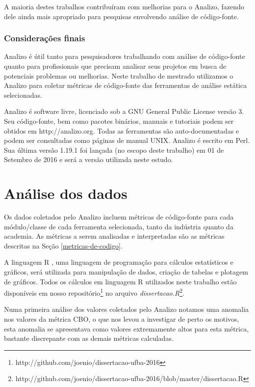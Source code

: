 A maioria destes trabalhos contribuíram com melhorias para o Analizo, fazendo
dele ainda mais apropriado para pesquisas envolvendo análise de código-fonte.

\subsubsection{Considerações finais}

Analizo é útil tanto para pesquisadores trabalhando com análise de código-fonte
quanto para profissionais que precisam analisar seus projetos em busca de
potenciais problemas ou melhorias. Neste trabalho de mestrado utilizamos o
Analizo para coletar métricas de código-fonte das ferramentas de análise
estática selecionadas.

Analizo é software livre, licenciado sob a GNU General Public License versão 3.
Seu código-fonte, bem como pacotes binários, manuais e tutoriais podem ser
obtidos em http://analizo.org. Todas as ferramentas são auto-documentadas e
podem ser consultadas como páginas de manual UNIX. Analizo é escrito em Perl.
Sua última versão 1.19.1 foi lançada (no escopo deste trabalho) em 01 de
Setembro de 2016 e será a versão utilizada neste estudo.

\section{Análise dos dados} \label{analise}

Os dados coletados pelo Analizo incluem métricas de código-fonte para cada módulo/classe de
cada ferramenta selecionada, tanto da indústria quanto da academia. As
métricas a serem analisadas e interpretadas são as métricas descritas na Seção
\ref{metricas-de-codigo}.

A linguagem R \cite{Ihaka1996}, uma linguagem de programação para cálculos
estatísticos e gráficos, será utilizada para manipulação de dados, criação de
tabelas e plotagem de gráficos. Todos os cálculos em linguagem R utilizados
neste trabalho estão disponíveis
em nosso repositório\footnote{http://github.com/joenio/dissertacao-ufba-2016} no arquivo {\em dissertacao.R}\footnote{http://github.com/joenio/dissertacao-ufba-2016/blob/master/dissertacao.R}.

Numa primeira análise dos valores coletados pelo Analizo notamos uma anomalia
nos valores da métrica CBO, o que nos levou a investigar de perto os motivos,
esta anomalia se apresentava como valores extremamente altos para esta métrica,
bastante discrepante com as demais métricas calculadas.

